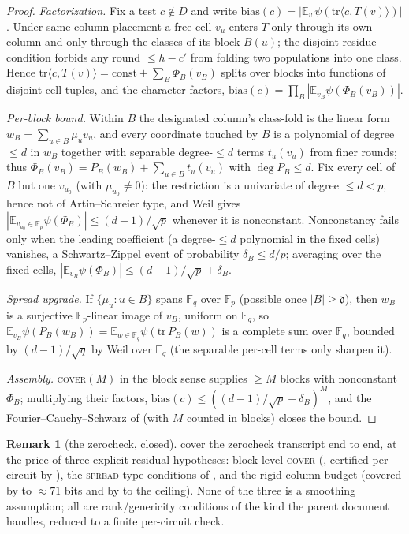 \documentclass{article}
\newcommand{\Fp}{\mathbb{F}_p}
\newcommand{\Fq}{\mathbb{F}_q}
\newcommand{\extdeg}{\mathfrak{d}}
\theoremstyle{definition}
\newtheorem{remark}[theorem]{Remark}
\begin{document}
\begin{proof}
\emph{Factorization.} Fix a test $c \notin D$ and write $\mathrm{bias}(c) = |\mathbb{E}_v\,\psi(\mathrm{tr}\langle c, T(v)\rangle)|$. Under same-column placement a free cell $v_u$ enters $T$ only through its own column and only through the classes of its block $B(u)$; the disjoint-residue condition forbids any round $\leq h - c'$ from folding two populations into one class. Hence $\mathrm{tr}\langle c, T(v)\rangle = \mathrm{const} + \sum_B \Phi_B(v_B)$ splits over blocks into functions of disjoint cell-tuples, and the character factors, $\mathrm{bias}(c) = \prod_B |\mathbb{E}_{v_B}\psi(\Phi_B(v_B))|$.

\emph{Per-block bound.} Within $B$ the designated column's class-fold is the linear form $w_B = \sum_{u\in B}\mu_u v_u$, and every coordinate touched by $B$ is a polynomial of degree $\leq d$ in $w_B$ together with separable degree-$\leq d$ terms $t_u(v_u)$ from finer rounds; thus $\Phi_B(v_B) = P_B(w_B) + \sum_{u\in B} t_u(v_u)$ with $\deg P_B \leq d$. Fix every cell of $B$ but one $v_{u_0}$ (with $\mu_{u_0}\neq0$): the restriction is a univariate of degree $\leq d < p$, hence not of Artin--Schreier type, and Weil gives $|\mathbb{E}_{v_{u_0}\in\Fp}\psi(\Phi_B)| \leq (d-1)/\sqrt p$ whenever it is nonconstant. Nonconstancy fails only when the leading coefficient (a degree-$\leq d$ polynomial in the fixed cells) vanishes, a Schwartz--Zippel event of probability $\delta_B \leq d/p$; averaging over the fixed cells, $|\mathbb{E}_{v_B}\psi(\Phi_B)| \leq (d-1)/\sqrt p + \delta_B$.

\emph{Spread upgrade.} If $\{\mu_u : u \in B\}$ spans $\Fq$ over $\Fp$ (possible once $|B| \geq \extdeg$), then $w_B$ is a surjective $\Fp$-linear image of $v_B$, uniform on $\Fq$, so $\mathbb{E}_{v_B}\psi(P_B(w_B)) = \mathbb{E}_{w\in\Fq}\psi(\mathrm{tr}\,P_B(w))$ is a complete sum over $\Fq$, bounded by $(d-1)/\sqrt q$ by Weil over $\Fq$ (the separable per-cell terms only sharpen it).

\emph{Assembly.} \textsc{cover}$(M)$ in the block sense supplies $\geq M$ blocks with nonconstant $\Phi_B$; multiplying their factors, $\mathrm{bias}(c) \leq ((d-1)/\sqrt p + \delta_B)^M$, and the Fourier--Cauchy--Schwarz of  (with $M$ counted in blocks) closes the bound.
\end{proof}

\begin{remark}[the zerocheck, closed]\label{rem:zerocheck-closed}
 cover the zerocheck transcript end to end, at the price of three explicit residual hypotheses: block-level \textsc{cover} (, certified per circuit by ), the \textsc{spread}-type conditions of , and the rigid-column budget (covered by  to $\approx 71$ bits and by  to the ceiling). None of the three is a smoothing assumption; all are rank/genericity conditions of the kind the parent document handles, reduced to a finite per-circuit check.
\end{remark}
\end{document}
